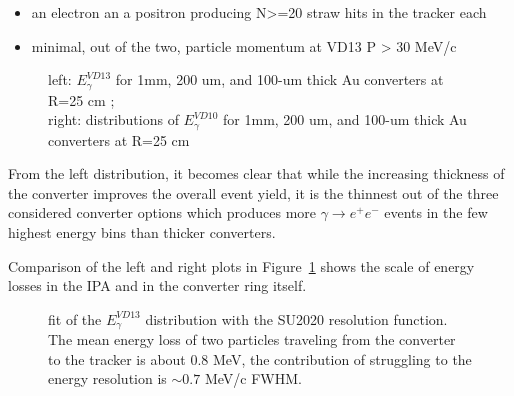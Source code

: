 \begin{itemize}
\item
  an electron an a positron producing N>=20 straw hits in the tracker each
\item
  minimal, out of the two, particle momentum at VD13 P > 30 MeV/c
\end{itemize}

\begin{figure}[H]
  \caption{
    \label{figure:sum_mom_vd13}
    left: $E_\gamma^{VD13}$ for 1mm, 200 um, and 100-um thick Au converters at R=25 cm ; \\
    right: distributions of $E_\gamma^{VD10}$ for 1mm, 200 um, and 100-um thick Au converters at R=25 cm
  }
\end{figure}

From the left distribution, it becomes clear that while the increasing thickness of the converter improves the
overall event yield, it is the thinnest out of the three considered converter options which produces
more $\gamma \to e^+e^-$ events in the few highest energy bins than thicker converters.

Comparison of the left and right plots in Figure~\ref{figure:sum_mom_vd13} shows the scale of energy
losses in the IPA and in the converter ring itself.

\begin{figure}[H]
  \caption{
    \label{figure:pipenu_bpip4b0_murat_track_ana_trk_0_p_fit}
    fit of the $E_\gamma^{VD13}$ distribution with the SU2020 resolution function.
    The mean energy loss of two particles traveling from the converter to the tracker is about 0.8 MeV,
    the contribution of struggling to the energy resolution is $\sim 0.7$ MeV/c FWHM. \\
  }
\end{figure}

